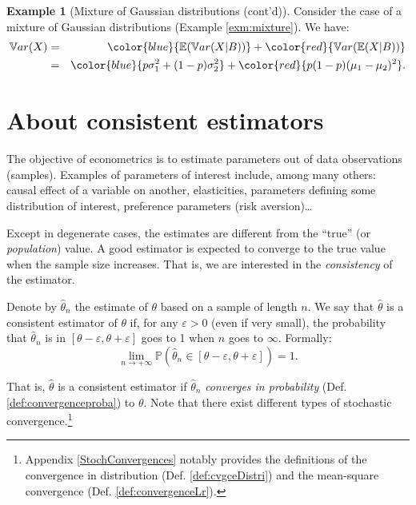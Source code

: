 \documentclass[
  12pt,
]{book}
\theoremstyle{definition}
\theoremstyle{definition}
\newtheorem{example}{Example}[chapter]
\theoremstyle{definition}
\theoremstyle{definition}
\theoremstyle{remark}
\begin{document}
\begin{example}[Mixture of Gaussian distributions (cont'd)]
\protect\hypertarget{exm:mixture2}{}\label{exm:mixture2}Consider the case of a mixture of Gaussian distributions (Example \ref{exm:mixture}). We have:
\begin{eqnarray*}
\mathbb{V}ar(X) &=& \color{blue}{\mathbb{E}(\mathbb{V}ar(X|B))} + \color{red}{\mathbb{V}ar(\mathbb{E}(X|B))}\\
&=&  \color{blue}{p\sigma_1^2+(1-p)\sigma_2^2} + \color{red}{p(1-p)(\mu_1 - \mu_2)^2}.
\end{eqnarray*}
\end{example}

\hypertarget{about-consistent-estimators}{%
\section{About consistent estimators}\label{about-consistent-estimators}}

The objective of econometrics is to estimate parameters out of data observations (samples). Examples of parameters of interest include, among many others: causal effect of a variable on another, elasticities, parameters defining some distribution of interest, preference parameters (risk aversion)\ldots{}

Except in degenerate cases, the estimates are different from the ``true'' (or \emph{population}) value. A good estimator is expected to converge to the true value when the sample size increases. That is, we are interested in the \emph{consistency} of the estimator.

Denote by \(\hat\theta_n\) the estimate of \(\theta\) based on a sample of length \(n\). We say that \(\hat\theta\) is a consistent estimator of \(\theta\) if, for any \(\varepsilon>0\) (even if very small), the probability that \(\hat\theta_n\) is in \([\theta - \varepsilon,\theta + \varepsilon]\) goes to 1 when \(n\) goes to \(\infty\). Formally:
\[
\lim_{n \rightarrow + \infty} \mathbb{P}\left(\hat\theta_n \in [\theta - \varepsilon,\theta + \varepsilon]\right) = 1.
\]

That is, \(\hat\theta\) is a consistent estimator if \(\hat\theta_n\) \emph{converges in probability} (Def. \ref{def:convergenceproba}) to \(\theta\). Note that there exist different types of stochastic convergence.\footnote{Appendix \ref{StochConvergences} notably provides the definitions of the convergence in distribution (Def. \ref{def:cvgceDistri}) and the mean-square convergence (Def. \ref{def:convergenceLr}).}
\end{document}
